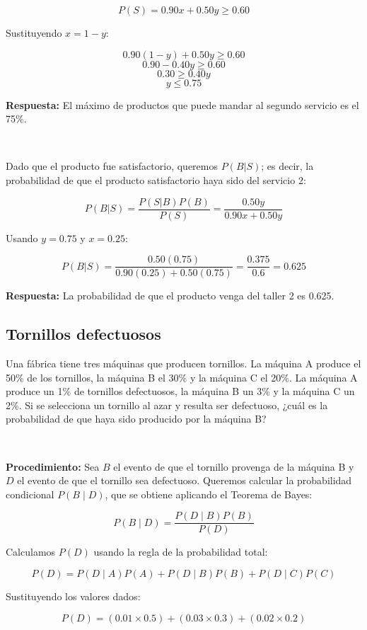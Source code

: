 \documentclass[letterpaper, 12pt]{article}
\begin{document}
	\[ P(S) = 0.90x + 0.50y \geq 0.60 \]
	
	Sustituyendo $x = 1-y$:
	
	\[ 0.90(1-y) + 0.50y \geq 0.60 \]
	\[ 0.90 - 0.40y \geq 0.60 \]
	\[ 0.30 \geq 0.40y \]
	\[ y \leq 0.75 \]
	
	\textbf{Respuesta:} El máximo de productos que puede mandar al segundo servicio es el 75\%.
	
	\,
	
	Dado que el producto fue satisfactorio, queremos $P(B|S)$; es decir, la probabilidad de que el producto satisfactorio haya sido del servicio 2:
	
	\[ P(B|S) = \frac{P(S|B)P(B)}{P(S)} = \frac{0.50y}{0.90x + 0.50y} \]
	
	Usando $y=0.75$ y $x=0.25$:
	
	\[ P(B|S) = \frac{0.50(0.75)}{0.90(0.25) + 0.50(0.75)} = \frac{0.375}{0.6} = 0.625 \]
	
	\textbf{Respuesta:} La probabilidad de que el producto venga del taller 2 es 0.625.
	
	\subsection{Tornillos defectuosos}
	
	Una fábrica tiene tres máquinas que producen tornillos. La máquina A produce el 50\% de los tornillos, la máquina B el 30\% y la máquina C el 20\%. La máquina A produce un 1\% de tornillos defectuosos, la máquina B un 3\% y la máquina C un 2\%. Si se selecciona un tornillo al azar y resulta ser defectuoso, ¿cuál es la probabilidad de que haya sido producido por la máquina B?
	
	\, 
	
	\textbf{Procedimiento:} Sea \( B \) el evento de que el tornillo provenga de la máquina B y \( D \) el evento de que el tornillo sea defectuoso. Queremos calcular la probabilidad condicional \( P(B \mid D) \), que se obtiene aplicando el Teorema de Bayes:
	
	\[
	P(B \mid D) = \frac{P(D \mid B) P(B)}{P(D)}
	\]
	
	Calculamos \( P(D) \) usando la regla de la probabilidad total:
	
	\[
	P(D) = P(D \mid A) P(A) + P(D \mid B) P(B) + P(D \mid C) P(C)
	\]
	
	Sustituyendo los valores dados:
	
	\[
	P(D) = (0.01 \times 0.5) + (0.03 \times 0.3) + (0.02 \times 0.2)
	\]
	
\end{document}
